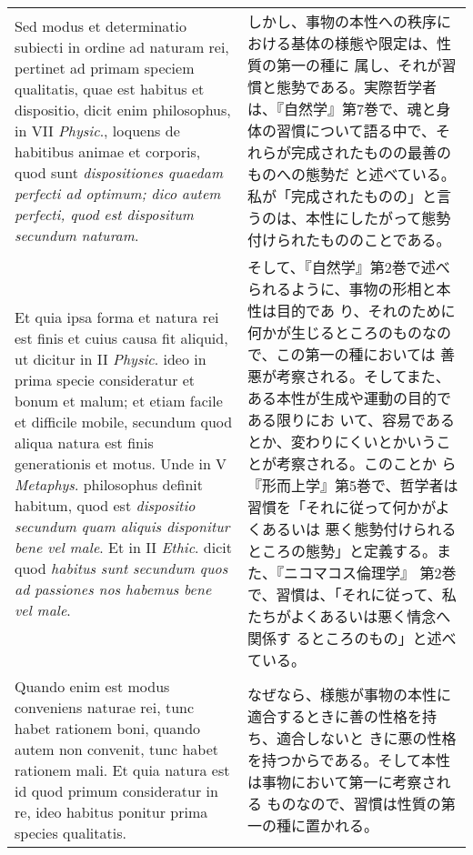 \documentclass[10pt]{jsarticle} %
\begin{document}
\begin{longtable}{p{21em}p{21em}}
\\


Sed modus et determinatio subiecti in ordine ad naturam rei, pertinet
ad primam speciem qualitatis, quae est habitus et dispositio, dicit
enim philosophus, in VII {\itshape Physic}., loquens de habitibus animae et
corporis, quod sunt {\itshape dispositiones quaedam perfecti ad optimum; dico
autem perfecti, quod est dispositum secundum naturam}.


&

しかし、事物の本性への秩序における基体の様態や限定は、性質の第一の種に
属し、それが習慣と態勢である。実際哲学者は、『自然学』第7巻で、魂と身
体の習慣について語る中で、それらが完成されたものの最善のものへの態勢だ
と述べている。私が「完成されたものの」と言うのは、本性にしたがって態勢
付けられたもののことである。


\\


Et quia ipsa forma et
natura rei est finis et cuius causa fit aliquid, ut dicitur in II
{\itshape Physic}. ideo in prima specie consideratur et bonum et malum; et etiam
facile et difficile mobile, secundum quod aliqua natura est finis
generationis et motus. Unde in V {\itshape Metaphys}. philosophus definit
habitum, quod est {\itshape dispositio secundum quam aliquis disponitur bene vel
male}. Et in II {\itshape Ethic}. dicit quod {\itshape habitus sunt secundum quos ad
passiones nos habemus bene vel male}. 



&

そして、『自然学』第2巻で述べられるように、事物の形相と本性は目的であ
り、それのために何かが生じるところのものなので、この第一の種においては
善悪が考察される。そしてまた、ある本性が生成や運動の目的である限りにお
いて、容易であるとか、変わりにくいとかいうことが考察される。このことか
ら『形而上学』第5巻で、哲学者は習慣を「それに従って何かがよくあるいは
悪く態勢付けられるところの態勢」と定義する。また、『ニコマコス倫理学』
第2巻で、習慣は、「それに従って、私たちがよくあるいは悪く情念へ関係す
るところのもの」と述べている。

\\


Quando enim est modus conveniens
naturae rei, tunc habet rationem boni, quando autem non convenit, tunc
habet rationem mali. Et quia natura est id quod primum consideratur in
re, ideo habitus ponitur prima species qualitatis.

&

なぜなら、様態が事物の本性に適合するときに善の性格を持ち、適合しないと
きに悪の性格を持つからである。そして本性は事物において第一に考察される
ものなので、習慣は性質の第一の種に置かれる。


\end{longtable}
\end{document}
